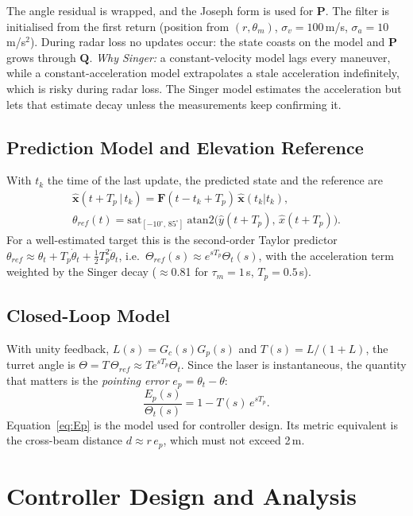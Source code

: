 \documentclass[conference]{IEEEtran}
\newcommand{\vect}[1]{\mathbf{#1}}
\newcommand{\Tp}{T_p}
\begin{document}
The angle residual is wrapped, and the Joseph form is used for $\vect P$. The
filter is initialised from the first return (position from $(r,\theta_m)$,
$\sigma_v=100$\,m/s, $\sigma_a=10$\,m/s$^2$). During radar loss no updates
occur: the state coasts on the model and $\vect P$ grows through $\vect Q$.
\emph{Why Singer:} a constant-velocity model lags every maneuver, while a
constant-acceleration model extrapolates a stale acceleration indefinitely,
which is risky during radar loss. The Singer model estimates the acceleration
but lets that estimate decay unless the measurements keep confirming it.

\subsection{Prediction Model and Elevation Reference}
With $t_k$ the time of the last update, the predicted state and the reference are
\begin{gather}
\hat{\vect x}(t+\Tp\,|\,t_k)=\vect F(t-t_k+\Tp)\,\hat{\vect x}(t_k|t_k),\\
\theta_{ref}(t)=\mathrm{sat}_{[-10^\circ,\,85^\circ]}\ \mathrm{atan2}\big(\hat y(t+\Tp),\,\hat x(t+\Tp)\big).
\end{gather}
For a well-estimated target this is the second-order Taylor predictor
$\theta_{ref}\approx\theta_t+\Tp\dot\theta_t+\tfrac12\Tp^2\ddot\theta_t$, i.e.\
$\Theta_{ref}(s)\approx e^{s\Tp}\Theta_t(s)$, with the acceleration term weighted
by the Singer decay ($\approx$0.81 for $\tau_m=1$\,s, $\Tp=0.5$\,s).

\subsection{Closed-Loop Model}
With unity feedback, $L(s)=G_c(s)G_p(s)$ and $T(s)=L/(1+L)$, the turret angle is
$\Theta=T\,\Theta_{ref}\approx T e^{s\Tp}\Theta_t$. Since the laser is
instantaneous, the quantity that matters is the \emph{pointing error}
$e_p=\theta_t-\theta$:
\begin{equation}
\frac{E_p(s)}{\Theta_t(s)}=1-T(s)\,e^{s\Tp}.
\label{eq:Ep}
\end{equation}
Equation~\eqref{eq:Ep} is the model used for controller design. Its metric
equivalent is the cross-beam distance $d\approx r\,e_p$, which must not
exceed 2\,m.

\section{Controller Design and Analysis}
\label{sec:design}
\end{document}
